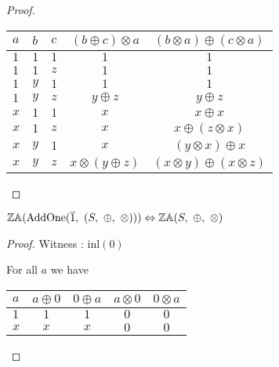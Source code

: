 \begin{proof}
\begin{center}
\begin{tabular}{lllcc}
\toprule
$a$ & $b$ & $c$ & $(b \oplus c) \otimes a$ & $(b \otimes a) \oplus (c \otimes a)$ \\
\midrule
$1$ & $1$ & $1$ & $1$ 						& $1$ \\
$1$ & $1$ & $z$ & $1$						& $1$ \\
$1$ & $y$ & $1$ & $1$						& $1$ \\
$1$ & $y$ & $z$ & $y \oplus z$				& $y \oplus z$ \\
$x$ & $1$ & $1$ & $x$						& $x \oplus x$ \\
$x$ & $1$ & $z$ & $x$						& $x \oplus (z \otimes x)$ \\
$x$ & $y$ & $1$ & $x$						& $(y \otimes x) \oplus x$ \\
$x$ & $y$ & $z$ & $x \otimes (y \oplus z)$	& $(x \otimes y) \oplus (x \otimes z)$ \\
\bottomrule
\end{tabular}
\end{center}
\end{proof}





\begin{theorem} \label{thm:addone_zero_annihilates}
$\propname{ZA}(\mathrm{AddOne}(\overline{1},\ (S,\ \oplus,\ \otimes))) \Leftrightarrow \propname{ZA}(S,\ \oplus,\ \otimes) $
\end{theorem}

\begin{proof}

\vspace{0.5em}

Witness : $\mathrm{inl}(0)$

\vspace{0.5em}

For all $a$ we have

\begin{center}
\begin{tabular}{lcccc}
\toprule
$a$ & $a \oplus 0$ & $0 \oplus a$ & $a \otimes 0$ & $0 \otimes a$ \\
\midrule
$1$ & $1$ & $1$ & $0$ & $0$ \\
$x$ & $x$ & $x$ & $0$ & $0$	\\
\bottomrule
\end{tabular}
\end{center}

\end{proof}





